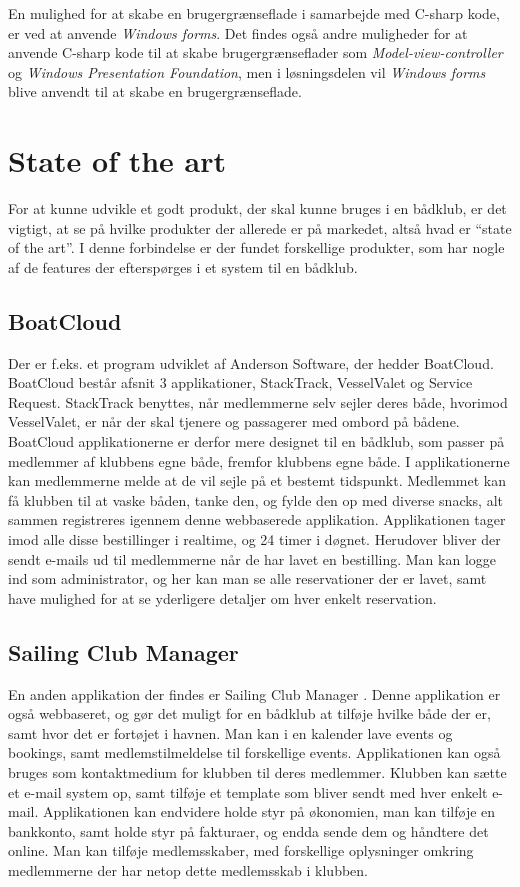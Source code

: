 En mulighed for at skabe en brugergrænseflade i samarbejde med C-sharp kode, er ved at anvende \textit{Windows forms}. 
Det findes også andre muligheder for at anvende C-sharp kode til at skabe brugergrænseflader som \textit{Model-view-controller} og \textit{Windows Presentation Foundation}, men i løsningsdelen vil \textit{Windows forms} blive anvendt til at skabe en brugergrænseflade. 

\section{State of the art}
For at kunne udvikle et godt produkt, der skal kunne bruges i en bådklub, er det vigtigt, at se på hvilke
produkter der allerede er på markedet, altså hvad er ``state of the art''. I denne forbindelse er der fundet
forskellige produkter, som har nogle af de features der efterspørges i et system til en bådklub. 
\newline
\subsection*{BoatCloud}
Der er f.eks.
et program udviklet af Anderson Software, der hedder BoatCloud.\citep{BoatCloud} BoatCloud består afsnit 3
applikationer, StackTrack, VesselValet og Service Request. StackTrack benyttes, når medlemmerne selv sejler
deres både, hvorimod VesselValet, er når der skal tjenere og passagerer med ombord på bådene. 
BoatCloud applikationerne er derfor mere designet til en bådklub, som passer på medlemmer af klubbens egne både, fremfor
klubbens egne både. 
I applikationerne kan medlemmerne melde at de vil sejle på et bestemt tidspunkt. 
Medlemmet kan få klubben til at vaske båden, tanke den, og fylde den op med diverse snacks, alt sammen registreres
igennem denne webbaserede applikation. 
Applikationen tager imod alle disse bestillinger i realtime, og 24 timer i døgnet. 
Herudover bliver der sendt e-mails ud til medlemmerne når de har lavet en bestilling. 
Man kan logge ind som administrator, og her kan man se alle reservationer der er lavet, samt have mulighed for at
se yderligere detaljer om hver enkelt reservation.

\subsection*{Sailing Club Manager}
En anden applikation der findes er Sailing Club Manager \citep{SailClub}. 
Denne applikation er også webbaseret, og gør det muligt for en bådklub at tilføje hvilke både der er, samt hvor det er fortøjet i havnen.
Man kan i en kalender lave events og bookings, samt medlemstilmeldelse til forskellige events. 
Applikationen kan også bruges som kontaktmedium for klubben til deres medlemmer. 
Klubben kan sætte et e-mail system op, samt tilføje et template som bliver sendt med hver enkelt e-mail. 
Applikationen kan endvidere holde styr på økonomien, man kan tilføje en bankkonto, samt  holde styr på fakturaer, og endda sende dem og håndtere det online. 
Man kan tilføje medlemsskaber, med forskellige oplysninger omkring medlemmerne der har netop dette medlemsskab i klubben.


